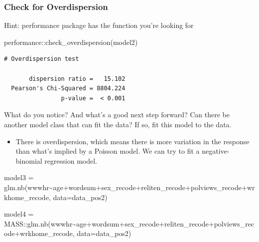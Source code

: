 \documentclass[
  letterpaper,
  DIV=11,
  numbers=noendperiod]{scrartcl}
\newenvironment{Shaded}{\begin{snugshade}}{\end{snugshade}}
\newcommand{\AttributeTok}[1]{\textcolor[rgb]{0.40,0.45,0.13}{#1}}
\newcommand{\FunctionTok}[1]{\textcolor[rgb]{0.28,0.35,0.67}{#1}}
\newcommand{\NormalTok}[1]{\textcolor[rgb]{0.00,0.23,0.31}{#1}}
\newcommand{\OtherTok}[1]{\textcolor[rgb]{0.00,0.23,0.31}{#1}}
\newcommand{\SpecialCharTok}[1]{\textcolor[rgb]{0.37,0.37,0.37}{#1}}
\providecommand{\tightlist}{%
  \setlength{\itemsep}{0pt}\setlength{\parskip}{0pt}}\usepackage{longtable,booktabs,array}
\begin{document}
\subsubsection{Check for Overdispersion}\label{check-for-overdispersion}

Hint: performance package has the function you're looking for

\begin{Shaded}
\begin{Highlighting}[]
\NormalTok{performance}\SpecialCharTok{::}\FunctionTok{check\_overdispersion}\NormalTok{(model2)}
\end{Highlighting}
\end{Shaded}

\begin{verbatim}
# Overdispersion test

       dispersion ratio =   15.102
  Pearson's Chi-Squared = 8804.224
                p-value =  < 0.001
\end{verbatim}

What do you notice? And what's a good next step forward? Can there be
another model class that can fit the data? If so, fit this model to the
data.

\begin{itemize}
\tightlist
\item
  There is overdispersion, which means there is more variation in the
  response than what's implied by a Poisson model. We can try to fit a
  negative-binomial regression model.
\end{itemize}

\begin{Shaded}
\begin{Highlighting}[]
\NormalTok{model3 }\OtherTok{=} \FunctionTok{glm.nb}\NormalTok{(wwwhr}\SpecialCharTok{\textasciitilde{}}\NormalTok{age}\SpecialCharTok{+}\NormalTok{wordsum}\SpecialCharTok{+}\NormalTok{sex\_recode}\SpecialCharTok{+}\NormalTok{reliten\_recode}\SpecialCharTok{+}\NormalTok{polviews\_recode}\SpecialCharTok{+}\NormalTok{wrkhome\_recode, }
              \AttributeTok{data=}\NormalTok{data\_pos2)}

\NormalTok{model4 }\OtherTok{=}\NormalTok{ MASS}\SpecialCharTok{::}\FunctionTok{glm.nb}\NormalTok{(wwwhr}\SpecialCharTok{\textasciitilde{}}\NormalTok{age}\SpecialCharTok{+}\NormalTok{wordsum}\SpecialCharTok{+}\NormalTok{sex\_recode}\SpecialCharTok{+}\NormalTok{reliten\_recode}\SpecialCharTok{+}\NormalTok{polviews\_recode}\SpecialCharTok{+}\NormalTok{wrkhome\_recode, }
              \AttributeTok{data=}\NormalTok{data\_pos2)}
\end{Highlighting}
\end{Shaded}
\end{document}
